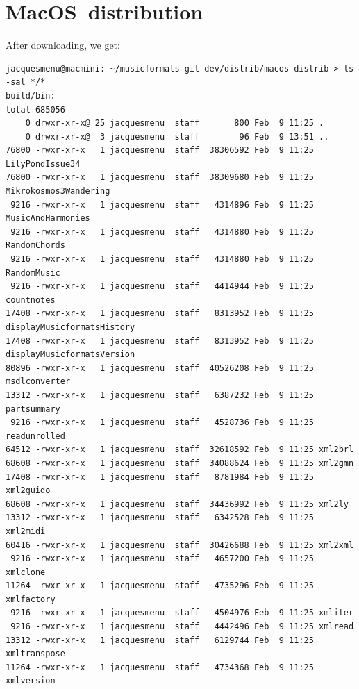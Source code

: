 \section{MacOS\texttrademark\ distribution}


After downloading, we get:
\begin{lstlisting}[language=Terminal]
jacquesmenu@macmini: ~/musicformats-git-dev/distrib/macos-distrib > ls -sal */*
build/bin:
total 685056
    0 drwxr-xr-x@ 25 jacquesmenu  staff       800 Feb  9 11:25 .
    0 drwxr-xr-x@  3 jacquesmenu  staff        96 Feb  9 13:51 ..
76800 -rwxr-xr-x   1 jacquesmenu  staff  38306592 Feb  9 11:25 LilyPondIssue34
76800 -rwxr-xr-x   1 jacquesmenu  staff  38309680 Feb  9 11:25 Mikrokosmos3Wandering
 9216 -rwxr-xr-x   1 jacquesmenu  staff   4314896 Feb  9 11:25 MusicAndHarmonies
 9216 -rwxr-xr-x   1 jacquesmenu  staff   4314880 Feb  9 11:25 RandomChords
 9216 -rwxr-xr-x   1 jacquesmenu  staff   4314880 Feb  9 11:25 RandomMusic
 9216 -rwxr-xr-x   1 jacquesmenu  staff   4414944 Feb  9 11:25 countnotes
17408 -rwxr-xr-x   1 jacquesmenu  staff   8313952 Feb  9 11:25 displayMusicformatsHistory
17408 -rwxr-xr-x   1 jacquesmenu  staff   8313952 Feb  9 11:25 displayMusicformatsVersion
80896 -rwxr-xr-x   1 jacquesmenu  staff  40526208 Feb  9 11:25 msdlconverter
13312 -rwxr-xr-x   1 jacquesmenu  staff   6387232 Feb  9 11:25 partsummary
 9216 -rwxr-xr-x   1 jacquesmenu  staff   4528736 Feb  9 11:25 readunrolled
64512 -rwxr-xr-x   1 jacquesmenu  staff  32618592 Feb  9 11:25 xml2brl
68608 -rwxr-xr-x   1 jacquesmenu  staff  34088624 Feb  9 11:25 xml2gmn
17408 -rwxr-xr-x   1 jacquesmenu  staff   8781984 Feb  9 11:25 xml2guido
68608 -rwxr-xr-x   1 jacquesmenu  staff  34436992 Feb  9 11:25 xml2ly
13312 -rwxr-xr-x   1 jacquesmenu  staff   6342528 Feb  9 11:25 xml2midi
60416 -rwxr-xr-x   1 jacquesmenu  staff  30426688 Feb  9 11:25 xml2xml
 9216 -rwxr-xr-x   1 jacquesmenu  staff   4657200 Feb  9 11:25 xmlclone
11264 -rwxr-xr-x   1 jacquesmenu  staff   4735296 Feb  9 11:25 xmlfactory
 9216 -rwxr-xr-x   1 jacquesmenu  staff   4504976 Feb  9 11:25 xmliter
 9216 -rwxr-xr-x   1 jacquesmenu  staff   4442496 Feb  9 11:25 xmlread
13312 -rwxr-xr-x   1 jacquesmenu  staff   6129744 Feb  9 11:25 xmltranspose
11264 -rwxr-xr-x   1 jacquesmenu  staff   4734368 Feb  9 11:25 xmlversion


\end{lstlisting}
